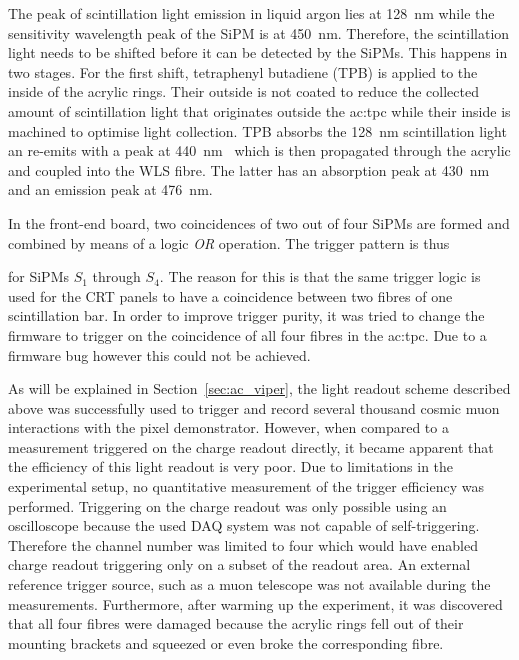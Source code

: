 The peak of scintillation light emission in liquid argon lies at \SI{128}{\nano\metre} while the sensitivity wavelength peak of the SiPM is at \SI{450}{\nano\metre}.
Therefore, the scintillation light needs to be shifted before it can be detected by the SiPMs.
This happens in two stages.
For the first shift, tetraphenyl butadiene (TPB) is applied to the inside of the acrylic rings.
Their outside is not coated to reduce the collected amount of scintillation light that originates outside the \gls{ac:tpc} while their inside is machined to optimise light collection.
TPB absorbs the \SI{128}{\nano\metre} scintillation light an re-emits with a peak at \SI{440}{\nano\metre}~\cite{tpb} which is then propagated through the acrylic and coupled into the WLS fibre.
The latter has an absorption peak at \SI{430}{\nano\metre} and an emission peak at \SI{476}{\nano\metre}.

In the front-end board, two coincidences of two out of four SiPMs are formed and combined by means of a logic \emph{OR} operation.
The trigger pattern is thus
for SiPMs $S_1$ through $S_4$.
The reason for this is that the same trigger logic is used for the CRT panels to have a coincidence between two fibres of one scintillation bar.
In order to improve trigger purity, it was tried to change the firmware to trigger on the coincidence of all four fibres in the \gls{ac:tpc}.
Due to a firmware bug however this could not be achieved.

As will be explained in Section~\ref{sec:ac_viper}, the light readout scheme described above was successfully used to trigger and record several thousand cosmic muon interactions with the \AC{} pixel demonstrator.
However, when compared to a measurement triggered on the charge readout directly, it became apparent that the efficiency of this light readout is very poor.
Due to limitations in the experimental setup, no quantitative measurement of the trigger efficiency was performed.
Triggering on the charge readout was only possible using an oscilloscope because the used DAQ system was not capable of self-triggering.
Therefore the channel number was limited to four which would have enabled charge readout triggering only on a subset of the readout area.
An external reference trigger source, such as a muon telescope was not available during the measurements.
Furthermore, after warming up the experiment, it was discovered that all four fibres were damaged because the acrylic rings fell out of their mounting brackets and squeezed or even broke the corresponding fibre.


